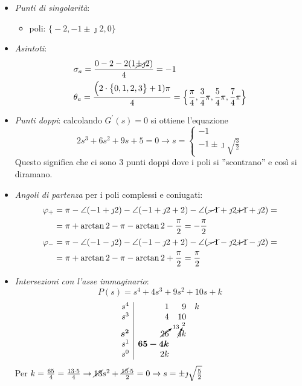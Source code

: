 \begin{esercizio}
\begin{itemize}
	\item \emph{Punti di singolarità}:
		\begin{itemize}
			\item poli: \(\bigl\{ -2, -1\pm\jmath2, 0 \bigr\}\)
		\end{itemize}
	\item \emph{Asintoti}:
		\begin{align*}
			& \sigma_a = \frac{0-2-2(1\cancel{\pm\jmath2})}{4} = -1 \\
			& \theta_a = \frac{\Bigl(2 \cdot \bigl\{ 0,1,2,3 \bigr\} +1)\pi}{4} = \Bigl\{ \frac{\pi}{4}, \frac{3}{4}\pi, \frac{5}{4}\pi, \frac{7}{4}\pi \Bigr\}
		\end{align*}
	\item \emph{Punti doppi}:
		calcolando \(G^\prime(s) = 0\) si ottiene l'equazione
		\[
			2s^3 +6s^2 +9s +5 = 0 \rightarrow s = \begin{cases} -1 \\ -1 \pm\jmath\sqrt{\frac{3}{2}} \end{cases}
		\]
		Questo significa che ci sono 3 punti doppi dove i poli si
		''scontrano'' e così si diramano.
	\item \emph{Angoli di partenza} per i poli complessi e coniugati:
		\begin{align*}
			\varphi_+ &= \pi - \angle(-1+\jmath2) -\angle(-1+\jmath2+2) -\angle(\cancel{-1}+\jmath2\cancel{+1}+\jmath2) = \\
				  &= \pi +\arctan{2} -\pi -\arctan{2} -\frac{\pi}{2} = -\frac{\pi}{2} \\
			\varphi_- &= \pi -\angle(-1-\jmath2) -\angle(-1-\jmath2+2) -\angle(\cancel{-1}-\jmath2\cancel{+1}-\jmath2) = \\
				  &= \pi +\arctan{2} -\pi -\arctan{2} +\frac{\pi}{2} = \frac{\pi}{2}
		\end{align*}
	\item \emph{Intersezioni con l'asse immaginario}:
		\[
			P(s) = s^4 +4s^3 +9s^2 +10s +k
		\]
		\[
			\begin{array}{r|rrr}
				s^4 & 1 &  9 & k \\
				s^3 & 4 & 10 \\
				\bm{s^2} & \cancelto{13}{26} & \cancelto{2}{4} k \\
				s^1 & \bm{65-4k} \\
				s^0 & 2k
			\end{array}
		\]
		Per \(k = \frac{65}{4} = \frac{13\cdot5}{4} \rightarrow \cancel{13}s^2 + \frac{\cancel{13}\cdot5}{2} = 0 \rightarrow s = \pm\jmath\sqrt{\frac{5}{2}}\)

\end{itemize}
\end{esercizio}
